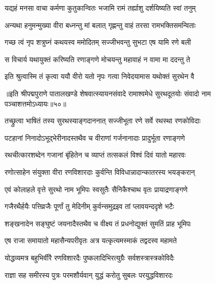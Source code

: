 \twolineshloka
{यद्यहं मनसा वाचा कर्मणा कुतुकान्वितः}
{भजामि रामं तर्ह्याशु दर्शयिष्यति स्वां तनुम्}%

\twolineshloka
{अन्यथा हनुमन्मुख्या वीरा बध्नन्तु मां बलात्}
{गृह्णन्तु वाहं तरसा रामभक्तिसमन्विताः}%

\twolineshloka
{गच्छ त्वं नृप शत्रुघ्नं कथयस्व ममोदितम्}
{सज्जीभवन्तु सुभटा एष यामि रणे बली}%

\twolineshloka
{स विचार्य यथायुक्तं करिष्यति रणाङ्गणे}
{मोचयन्तु महावाहं न वामा मा ददन्तु ते}%


\twolineshloka
{इति श्रुत्वास्मि तं कृत्वा ययौ वीरो यतो नृपः}
{गत्वा निवेदयामास यथोक्तं सुरथेन वै}%

॥इति श्रीपद्मपुराणे पातालखण्डे शेषवात्स्यायनसंवादे रामाश्वमेधे सुरथदूतयोः संवादो नाम पञ्चाशत्तमोऽध्यायः॥५०॥



\twolineshloka
{तच्छ्रुत्वा भाषितं तस्य सुरथस्याङ्गदाननात्}
{सज्जीभूता रणे सर्वे रथस्था रणकोविदाः}%

\twolineshloka
{पटहानां निनादोऽभूद्भेरीनादस्तथैव च}
{वीराणां गर्जनानादाः प्रादुर्भूता रणाङ्गणे}%

\twolineshloka
{रथचीत्कारशब्देन गजानां बृंहितेन च}
{व्याप्तं तत्सकलं विश्वं दिवं यातो महारवः}%

\twolineshloka
{रणोत्साहेन संयुक्ता वीरा रणविशारदाः}
{कुर्वन्ति विविधान्नादान्कातरस्य भयङ्करान्}%

\twolineshloka
{एवं कोलाहले वृत्ते सुरथो नाम भूमिपः}
{स्वसुतैः सैनिकैश्चाथ वृतः प्रायाद्रणाङ्गणे}%

\twolineshloka
{गजैरथैर्हयैः पत्तिव्रजैः पूर्णां तु मेदिनीम्}
{कुर्वन्समुद्रइव तां प्लावयन्ददृशे भटैः}%

\twolineshloka
{शङ्खनादेन सङ्घुष्टं जयनादैस्तथैव च}
{वीक्ष्य तं प्रधनोद्युक्तं सुमतिं प्राह भूमिपः}%


\twolineshloka
{एष राजा समायातो महासैन्यपरीवृतः}
{अत्र यत्कृत्यमस्माकं तद्वदस्व महामते}%


\twolineshloka
{योद्धव्यमत्र बहुभिर्वीरै रणविशारदैः}
{पुष्कलादिभिरत्युग्रैः सर्वशस्त्रास्त्रकोविदैः}%

\twolineshloka
{राज्ञा सह समीरस्य पुत्रः परमशौर्यवान्}
{युद्धं करोतु सुबलः परयुद्धविशारदः}%


